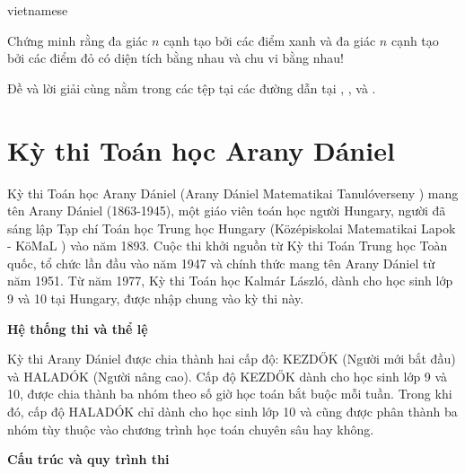 \documentclass{article}
\begin{document}
\begin{otherlanguage*}{vietnamese}
\begin{problem*}
    Chứng minh rằng đa giác \( n \) cạnh tạo bởi các điểm xanh và đa giác \( n \) cạnh tạo bởi các điểm đỏ có diện tích bằng nhau và chu vi bằng nhau!
\end{problem*}

\begin{remark*}
    Đề và lời giải cùng nằm trong các tệp tại các đường dẫn tại \cite{vt_7_o_2}, \cite{vt_8_o_1}, và \cite{vt_8_o_2}.
\end{remark*}

\newpage

\section{Kỳ thi Toán học Arany Dániel}

Kỳ thi Toán học Arany Dániel (Arany Dániel Matematikai Tanulóverseny \cite{AranyDaniel}) mang tên Arany Dániel (1863-1945), một giáo viên toán học người Hungary,
người đã sáng lập Tạp chí Toán học Trung học Hungary (Középiskolai Matematikai Lapok - KöMaL \cite{KoMaL}) vào năm 1893.
Cuộc thi khởi nguồn từ Kỳ thi Toán Trung học Toàn quốc, tổ chức lần đầu vào năm 1947 và chính thức mang tên Arany Dániel từ năm 1951.
Từ năm 1977, Kỳ thi Toán học Kalmár László, dành cho học sinh lớp 9 và 10 tại Hungary, được nhập chung vào kỳ thi này.

\textbf{Hệ thống thi và thể lệ}

Kỳ thi Arany Dániel được chia thành hai cấp độ: KEZDŐK (Người mới bắt đầu) và HALADÓK (Người nâng cao).
Cấp độ KEZDŐK dành cho học sinh lớp 9 và 10, được chia thành ba nhóm theo số giờ học toán bắt buộc mỗi tuần.
Trong khi đó, cấp độ HALADÓK chỉ dành cho học sinh lớp 10 và cũng được phân thành ba nhóm tùy thuộc vào chương trình học toán chuyên sâu hay không.

\textbf{Cấu trúc và quy trình thi}


\end{otherlanguage*}
\end{document}

